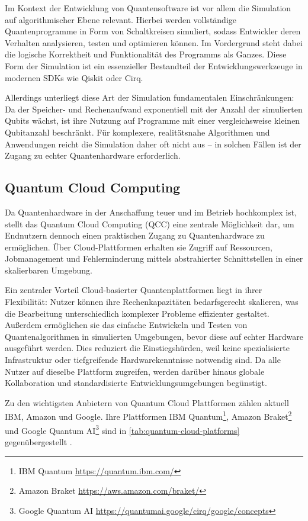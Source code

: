 Im Kontext der Entwicklung von Quantensoftware ist vor allem die Simulation auf algorithmischer Ebene relevant. Hierbei werden vollständige Quantenprogramme in Form von Schaltkreisen simuliert, sodass Entwickler deren Verhalten analysieren, testen und optimieren können. Im Vordergrund steht dabei die logische Korrektheit und Funktionalität des Programms als Ganzes. Diese Form der Simulation ist ein essenzieller Bestandteil der Entwicklungswerkzeuge in modernen SDKs wie Qiskit oder Cirq.

Allerdings unterliegt diese Art der Simulation fundamentalen Einschränkungen: Da der Speicher- und Rechenaufwand exponentiell mit der Anzahl der simulierten Qubits wächst, ist ihre Nutzung auf Programme mit einer vergleichsweise kleinen Qubitanzahl beschränkt. Für komplexere, realitätsnahe Algorithmen und Anwendungen reicht die Simulation daher oft nicht aus -- in solchen Fällen ist der Zugang zu echter Quantenhardware erforderlich. \autocite{cicero_simulation_2025}

\subsection{Quantum Cloud Computing}
\label{sec:quantum-cloud-computing}

Da Quantenhardware in der Anschaffung teuer und im Betrieb hochkomplex ist, stellt das Quantum Cloud Computing (QCC) eine zentrale Möglichkeit dar, um Endnutzern dennoch einen praktischen Zugang zu Quantenhardware zu ermöglichen. Über Cloud-Plattformen erhalten sie Zugriff auf Ressourcen, Jobmanagement und Fehlerminderung mittels abstrahierter Schnittstellen in einer skalierbaren Umgebung.

Ein zentraler Vorteil Cloud-basierter Quantenplattformen liegt in ihrer Flexibilität: Nutzer können ihre Rechenkapazitäten bedarfsgerecht skalieren, was die Bearbeitung unterschiedlich komplexer Probleme effizienter gestaltet. Außerdem ermöglichen sie das einfache Entwickeln und Testen von Quantenalgorithmen in simulierten Umgebungen, bevor diese auf echter Hardware ausgeführt werden. Dies reduziert die Einstiegshürden, weil keine spezialisierte Infrastruktur oder tiefgreifende Hardwarekenntnisse notwendig sind. Da alle Nutzer auf dieselbe Plattform zugreifen, werden darüber hinaus globale Kollaboration und standardisierte Entwicklungsumgebungen begünstigt.

Zu den wichtigsten Anbietern von Quantum Cloud Plattformen zählen aktuell IBM, Amazon und Google. Ihre Plattformen IBM Quantum\footnote{IBM Quantum \url{https://quantum.ibm.com/}}, Amazon Braket\footnote{Amazon Braket \url{https://aws.amazon.com/braket/}} und Google Quantum AI\footnote{Google Quantum AI \url{https://quantumai.google/cirq/google/concepts}} sind in \autoref{tab:quantum-cloud-platforms} gegenübergestellt \autocite{golec_quantum_2024}.

